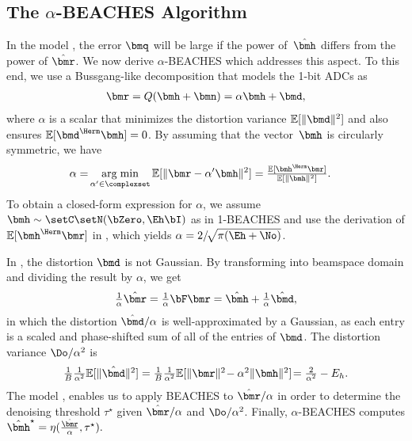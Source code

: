 \subsection{The $\alpha$-BEACHES Algorithm} \label{sec:alphaBEACHES}
In the model , the error $\bmq$ will be large if the power of~$\hhat$ differs from the power of $\rhat$.
%
We now derive $\alpha$-BEACHES which addresses this aspect.
%
To this end, we use a Bussgang-like decomposition \cite{bussgang52a} that models the 1-bit ADCs as 
\begin{align} \label{eq:bussgang_decomposition}
\bmr = Q(\bmh+\bmn) = \alpha \bmh + \bmd,
\end{align}
where $\alpha$ is a scalar that minimizes the distortion variance $\smolE{\|\bmd\|^2}$ and also ensures $\smolE{\bmd^\Herm\bmh}=0$.
%
By assuming that the vector~$\bmh$ is circularly symmetric, we have
\begin{align} \label{eq:alpha_bussgang_general}
\alpha = & 
\argmin_{\alpha^\prime\in\complexset}\smolE{\|\bmr-\alpha^\prime\bmh\|^2} 
= \textstyle \frac{\smolE{\bmh^\Herm \bmr}}{\smolE{\|\bmh\|^2}}.
\end{align}
To obtain a closed-form expression for $\alpha$, we assume $\bmh\sim\setC\setN(\bZero,\Eh\bI)$ as in 1-BEACHES
and use the derivation of $\smolE{\bmh^\Herm\bmr}$ in ,  which yields 
$\alpha = {2}/{\!\sqrt{\pi({\Eh}+{\No})}}$.


In , the distortion $\bmd$ is not Gaussian. By transforming into beamspace domain and dividing the result by $\alpha$, we get
\begin{align} \label{eq:bussgang_decomposition_beamspace}
\textstyle \frac{1}{\alpha}\rhat = \frac{1}{\alpha}\bF \bmr =  \hhat + \frac{1}{\alpha}\dhat,
\end{align}
in which the distortion $ {\dhat}/{\alpha}$ is well-approximated by a  Gaussian, as each entry is a scaled and phase-shifted sum of all of the entries of $\bmd$. The distortion variance ${\Do}/{\alpha^2}$ is 
\begin{align}
\textstyle \frac{1}{B}\frac{1}{\alpha^2} \smolE{\|\dhat\|^2}
= \frac{1}{B}\frac{1}{\alpha^2}\smolE{\|\bmr\|^2\!-\alpha^2\|\bmh\|^2}\! = \frac{2}{\alpha^2}-E_h.
\end{align}
%
The model , enables us to apply BEACHES to $\rhat/{\alpha}$ in order to determine the denoising threshold $\tau^\star$ given $\rhat/\alpha$ and $\Do/\alpha^2$. Finally, $\alpha$-BEACHES computes $\hhatstar = \eta(\frac{\rhat}{\alpha},\tau^\star).$
